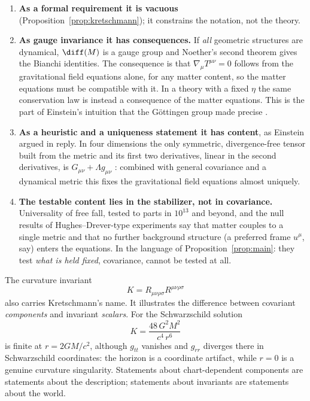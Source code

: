 \begin{enumerate}[leftmargin=1.8em,itemsep=3pt,label=\textbf{\arabic*.}]
\item \textbf{As a formal requirement it is vacuous}
  (Proposition~\ref{prop:kretschmann}); it constrains the notation, not the
  theory.
\item \textbf{As gauge invariance it has consequences.} If \emph{all}
  geometric structures are dynamical, $\diff(M)$ is a gauge group and
  Noether's second theorem gives the Bianchi identities. The consequence is
  that $\nabla_\mu T^{\mu\nu}=0$ follows from the gravitational field equations
  alone, for any matter content, so the matter equations must be compatible
  with it. In a theory with a fixed $\eta$ the same conservation law is
  instead a consequence of the matter equations. This is the part of Einstein's
  intuition that the G\"ottingen group made precise \cite{ks}.
\item \textbf{As a heuristic and a uniqueness statement it has content}, as
  Einstein argued in reply. In four dimensions the only symmetric,
  divergence-free tensor built from the metric and its first two derivatives,
  linear in the second derivatives, is $G_{\mu\nu}+\Lambda g_{\mu\nu}$
  \cite{lovelock}: combined with general covariance and a dynamical metric this
  fixes the gravitational field equations almost uniquely.
\item \textbf{The testable content lies in the stabilizer, not in
  covariance.} Universality of free fall, tested to parts in $10^{13}$ and
  beyond, and the null results of Hughes--Drever-type experiments say that
  matter couples to a single metric and that no further background structure
  (a preferred frame $u^\mu$, say) enters the equations. In the language of
  Proposition~\ref{prop:main}: they test \emph{what is held fixed}, 
 covariance, cannot be   tested at all.
\end{enumerate}

\begin{remark}\label{rem:kretschmann-scalar}
The curvature invariant
\begin{equation}
  K=R_{\mu\nu\rho\sigma}R^{\mu\nu\rho\sigma}
\end{equation}
also carries Kretschmann's name. It illustrates the difference between covariant
\emph{components} and invariant \emph{scalars}. For the Schwarzschild solution
\begin{equation}
  K=\frac{48\,G^2M^2}{c^4\,r^6}
\end{equation}
is finite at $r=2GM/c^2$, although $g_{tt}$ vanishes and $g_{rr}$ diverges
there in Schwarzschild coordinates: the horizon is a coordinate artifact,
while $r=0$ is a genuine curvature singularity. Statements about
chart-dependent components are statements about the description; statements
about invariants are statements about the world.
\end{remark}

